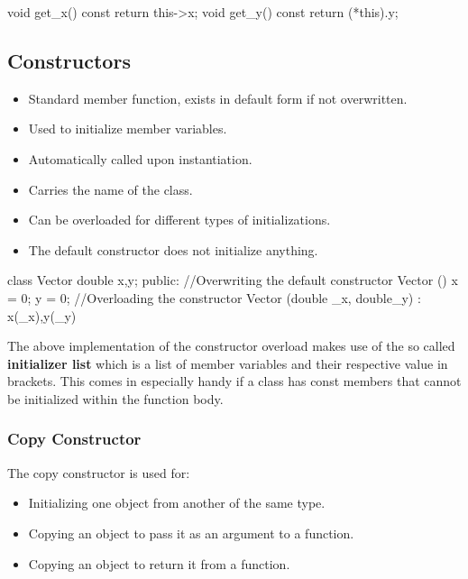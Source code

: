 \documentclass[10pt,a4paper]{scrartcl}
\begin{document}
\begin{multicols*}{2}
\begin{TPCpp}
void get_x() const {return this->x;}
void get_y() const {return (*this).y;}
\end{TPCpp}

\subsection{Constructors}
\label{sec:Constructors}

\begin{itemize}
\item Standard member function, exists in default form if not overwritten.
\item Used to initialize member variables.
\item Automatically called upon instantiation.
\item Carries the name of the class.
\item Can be overloaded for different types of initializations.
\item The default constructor does not initialize anything.
\end{itemize}

\begin{TPCpp}
class Vector {
	double x,y;
public:
	//Overwriting the default constructor
	Vector (){
		x = 0;
		y = 0;
	}
	//Overloading the constructor
	Vector (double _x, double_y)
		: x(_x),y(_y) {}
}
\end{TPCpp}

The above implementation of the constructor overload makes use of the so called \textbf{initializer list} which is a list of member variables and their respective value in brackets. This comes in especially handy if a class has const members that cannot be initialized within the function body.

\subsubsection{Copy Constructor}
\label{sec:CopyConstructor}

The copy constructor is used for:

\begin{itemize}
\item Initializing one object from another of the same type.
\item Copying an object to pass it as an argument to a function.
\item Copying an object to return it from a function.
\end{itemize}


\end{multicols*}
\end{document}
